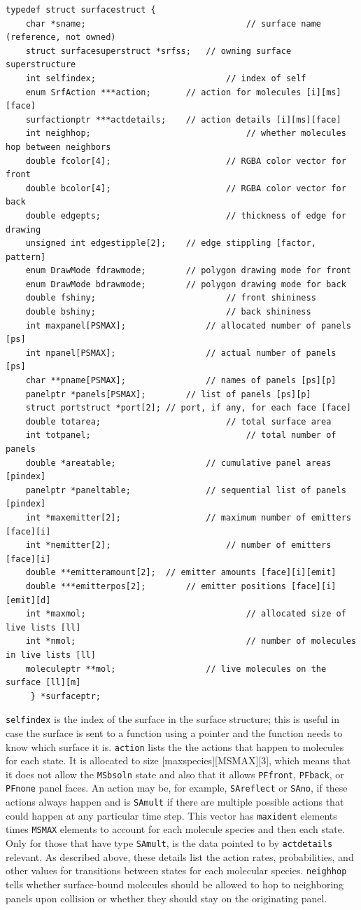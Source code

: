 \documentclass {scrbook}
\newcommand {\ttt} {\texttt}
\begin{document}
\begin{lstlisting}
typedef struct surfacestruct {
	char *sname;								// surface name (reference, not owned)
	struct surfacesuperstruct *srfss;	// owning surface superstructure
	int selfindex;							// index of self
	enum SrfAction ***action;		// action for molecules [i][ms][face]
	surfactionptr ***actdetails;	// action details [i][ms][face]
	int neighhop;								// whether molecules hop between neighbors
	double fcolor[4];						// RGBA color vector for front
	double bcolor[4];						// RGBA color vector for back
	double edgepts;							// thickness of edge for drawing
	unsigned int edgestipple[2];	// edge stippling [factor, pattern]
	enum DrawMode fdrawmode;		// polygon drawing mode for front
	enum DrawMode bdrawmode;		// polygon drawing mode for back
	double fshiny;							// front shininess
	double bshiny;							// back shininess
	int maxpanel[PSMAX];				// allocated number of panels [ps]
	int npanel[PSMAX];					// actual number of panels [ps]
	char **pname[PSMAX];				// names of panels [ps][p]
	panelptr *panels[PSMAX];		// list of panels [ps][p]
	struct portstruct *port[2];	// port, if any, for each face [face]
	double totarea;							// total surface area
	int totpanel;								// total number of panels
	double *areatable;					// cumulative panel areas [pindex]
	panelptr *paneltable;				// sequential list of panels [pindex]
	int *maxemitter[2];					// maximum number of emitters [face][i]
	int *nemitter[2];						// number of emitters [face][i]
	double **emitteramount[2];	// emitter amounts [face][i][emit]
	double ***emitterpos[2];		// emitter positions [face][i][emit][d]
	int *maxmol;								// allocated size of live lists [ll]
	int *nmol;									// number of molecules in live lists [ll]
	moleculeptr **mol;					// live molecules on the surface [ll][m]
	 } *surfaceptr;
\end{lstlisting}

\ttt{selfindex} is the index of the surface in the surface structure; this is useful in case the surface is sent to a function using a pointer and the function needs to know which surface it is. \ttt{action} lists the the actions that happen to molecules for each state. It is allocated to size [maxspecies][MSMAX][3], which means that it does not allow the \ttt{MSbsoln} state and also that it allows \ttt{PFfront}, \ttt{PFback}, or \ttt{PFnone} panel faces. An action may be, for example, \ttt{SAreflect} or \ttt{SAno}, if these actions always happen and is \ttt{SAmult} if there are multiple possible actions that could happen at any particular time step. This vector has \ttt{maxident} elements times \ttt{MSMAX} elements to account for each molecule species and then each state. Only for those that have type \ttt{SAmult}, is the data pointed to by \ttt{actdetails} relevant. As described above, these details list the action rates, probabilities, and other values for transitions between states for each molecular species. \ttt{neighhop} tells whether surface-bound molecules should be allowed to hop to neighboring panels upon collision or whether they should stay on the originating panel.
\end{document}
